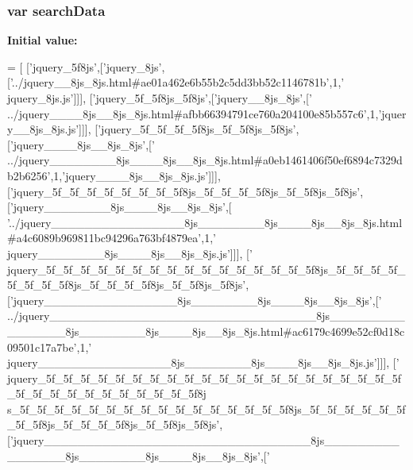 \subsubsection[{search\+Data}]{\setlength{\rightskip}{0pt plus 5cm}var search\+Data}\label{variables__b_8js_ad01a7523f103d6242ef9b0451861231e}
{\bfseries Initial value\+:}
\begin{DoxyCode}
=
[
  [\textcolor{stringliteral}{'jquery\_5f8js'},[\textcolor{stringliteral}{'jquery\_8js'},[\textcolor{stringliteral}{'../jquery\_\_8js\_8js.html#ae01a462e6b55b2c5dd3bb52c1146781b'},1,\textcolor{stringliteral}{'
      jquery\_8js.js'}]]],
  [\textcolor{stringliteral}{'jquery\_5f\_5f8js\_5f8js'},[\textcolor{stringliteral}{'jquery\_\_8js\_8js'},[\textcolor{stringliteral}{'
      ../jquery\_\_\_\_8js\_\_8js\_8js.html#afbb66394791ce760a204100e85b557c6'},1,\textcolor{stringliteral}{'jquery\_\_8js\_8js.js'}]]],
  [\textcolor{stringliteral}{'jquery\_5f\_5f\_5f\_5f8js\_5f\_5f8js\_5f8js'},[\textcolor{stringliteral}{'jquery\_\_\_\_8js\_\_8js\_8js'},[\textcolor{stringliteral}{'
      ../jquery\_\_\_\_\_\_\_\_8js\_\_\_\_8js\_\_8js\_8js.html#a0eb1461406f50ef6894c7329db2b6256'},1,\textcolor{stringliteral}{'jquery\_\_\_\_8js\_\_8js\_8js.js'}]]],
  [\textcolor{stringliteral}{'jquery\_5f\_5f\_5f\_5f\_5f\_5f\_5f\_5f8js\_5f\_5f\_5f\_5f8js\_5f\_5f8js\_5f8js'},[\textcolor{stringliteral}{'jquery\_\_\_\_\_\_\_\_8js\_\_\_\_8js\_\_8js\_8js'},[\textcolor{stringliteral}{
      '../jquery\_\_\_\_\_\_\_\_\_\_\_\_\_\_\_\_8js\_\_\_\_\_\_\_\_8js\_\_\_\_8js\_\_8js\_8js.html#a4c6089b969811bc94296a763bf4879ea'},1,\textcolor{stringliteral}{'
      jquery\_\_\_\_\_\_\_\_8js\_\_\_\_8js\_\_8js\_8js.js'}]]],
  [\textcolor{stringliteral}{'
      jquery\_5f\_5f\_5f\_5f\_5f\_5f\_5f\_5f\_5f\_5f\_5f\_5f\_5f\_5f\_5f\_5f8js\_5f\_5f\_5f\_5f\_5f\_5f\_5f\_5f8js\_5f\_5f\_5f\_5f8js\_5f\_5f8js\_5f8js'},[\textcolor{stringliteral}{'jquery\_\_\_\_\_\_\_\_\_\_\_\_\_\_\_\_8js\_\_\_\_\_\_\_\_8js\_\_\_\_8js\_\_8js\_8js'},[\textcolor{stringliteral}{'
      ../jquery\_\_\_\_\_\_\_\_\_\_\_\_\_\_\_\_\_\_\_\_\_\_\_\_\_\_\_\_\_\_\_\_8js\_\_\_\_\_\_\_\_\_\_\_\_\_\_\_\_8js\_\_\_\_\_\_\_\_8js\_\_\_\_8js\_\_8js\_8js.html#ac6179c4699e52cf0d18c09501c17a7be'},1,\textcolor{stringliteral}{'
      jquery\_\_\_\_\_\_\_\_\_\_\_\_\_\_\_\_8js\_\_\_\_\_\_\_\_8js\_\_\_\_8js\_\_8js\_8js.js'}]]],
  [\textcolor{stringliteral}{'
      jquery\_5f\_5f\_5f\_5f\_5f\_5f\_5f\_5f\_5f\_5f\_5f\_5f\_5f\_5f\_5f\_5f\_5f\_5f\_5f\_5f\_5f\_5f\_5f\_5f\_5f\_5f\_5f\_5f\_5f\_5f\_5f\_5f8j
      s\_5f\_5f\_5f\_5f\_5f\_5f\_5f\_5f\_5f\_5f\_5f\_5f\_5f\_5f\_5f\_5f8js\_5f\_5f\_5f\_5f\_5f\_5f\_5f\_5f8js\_5f\_5f\_5f\_5f8js\_5f\_5f8js\_5f8js'},[\textcolor{stringliteral}{'jquery\_\_\_\_\_\_\_\_\_\_\_\_\_\_\_\_\_\_\_\_\_\_\_\_\_\_\_\_\_\_\_\_8js\_\_\_\_\_\_\_\_\_\_\_\_\_\_\_\_8js\_\_\_\_\_\_\_\_8js\_\_\_\_8js\_\_8js\_8js'},[\textcolor{stringliteral}{'
}
\end{DoxyCode}
